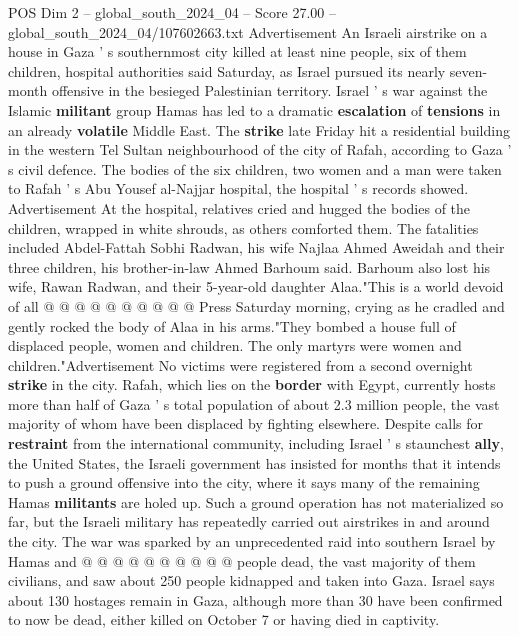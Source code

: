 \begin{textsample}{POS Dim 2 – global\_south\_2024\_04 – Score 27.00 – global\_south\_2024\_04/107602663.txt}  \label{ex:f2_pos_047}
Advertisement An Israeli airstrike on a house in Gaza ' s southernmost city killed at least nine people, six of them children, hospital authorities said Saturday, as Israel pursued its nearly seven-month offensive in the besieged Palestinian territory.
Israel ' s war against the Islamic \textbf{militant} group Hamas has led to a dramatic \textbf{escalation} of \textbf{tensions} in an already \textbf{volatile} Middle East.
The \textbf{strike} late Friday hit a residential building in the western Tel Sultan neighbourhood of the city of Rafah, according to Gaza ' s civil defence.
The bodies of the six children, two women and a man were taken to Rafah ' s Abu Yousef al-Najjar hospital, the hospital ' s records showed.
Advertisement At the hospital, relatives cried and hugged the bodies of the children, wrapped in white shrouds, as others comforted them.
The fatalities included Abdel-Fattah Sobhi Radwan, his wife Najlaa Ahmed Aweidah and their three children, his brother-in-law Ahmed Barhoum said.
Barhoum also lost his wife, Rawan Radwan, and their 5-year-old daughter Alaa."This is a world devoid of all @ @ @ @ @ @ @ @ @ @ Press Saturday morning, crying as he cradled and gently rocked the body of Alaa in his arms."They bombed a house full of displaced people, women and children.
The only martyrs were women and children."Advertisement No victims were registered from a second overnight \textbf{strike} in the city.
Rafah, which lies on the \textbf{border} with Egypt, currently hosts more than half of Gaza ' s total population of about 2.3 million people, the vast majority of whom have been displaced by fighting elsewhere.
Despite calls for \textbf{restraint} from the international community, including Israel ' s staunchest \textbf{ally}, the United States, the Israeli government has insisted for months that it intends to push a ground offensive into the city, where it says many of the remaining Hamas \textbf{militants} are holed up.
Such a ground operation has not materialized so far, but the Israeli military has repeatedly carried out airstrikes in and around the city.
The war was sparked by an unprecedented raid into southern Israel by Hamas and @ @ @ @ @ @ @ @ @ @ people dead, the vast majority of them civilians, and saw about 250 people kidnapped and taken into Gaza.
Israel says about 130 hostages remain in Gaza, although more than 30 have been confirmed to now be dead, either killed on October 7 or having died in captivity.

\end{textsample}
